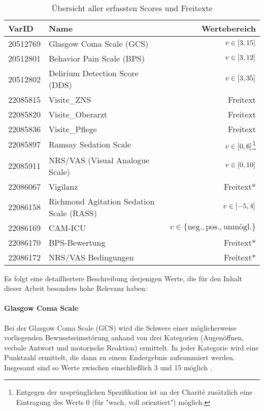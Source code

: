 \begin{table}[htb] %
    \centering
    \begin{tabular}{llr}\toprule
        \textbf{VarID}	&\textbf{Name} &\textbf{Wertebereich} \\\midrule
        20512769    & Glasgow Coma Scale (GCS)          & $v \in \interval{3}{15}$ \\
        20512801    & Behavior Pain Scale (BPS)         & $v \in \interval{3}{12}$ \\
        20512802    & Delirium Detection Score (DDS)    & $v \in \interval{3}{35}$ \\
        22085815    & Visite\_ZNS                        & Freitext \\
        22085820    & Visite\_Oberarzt                   & Freitext \\
        22085836    & Visite\_Pflege                     & Freitext \\
        22085897    & Ramsay Sedation Scale             & $v \in \interval{0}{6}$\footnote{Entgegen der ursprünglichen Spezifikation ist an der Charité zusätzlich eine Eintragung des Werts $0$ (für "wach, voll orientiert") möglich.} \\
        22085911    & NRS/VAS (Visual Analogue Scale)   & $v \in \interval{0}{10}$ \\
        22086067    & Vigilanz                          & Freitext* \\
        22086158    & Richmond Agitation Sedation Scale (RASS) & $v \in \interval{-5}{4}$ \\
        22086169    & CAM-ICU                           & $v \in \{	\text{neg.}, \text{pos.}, \text{unmögl.} \}$ \\
        22086170    & BPS-Bewertung                     & Freitext* \\
        22086172    & NRS/VAS Bedingungen               & Freitext* \\\bottomrule
    \end{tabular}

    \caption{Übersicht aller erfassten Scores und Freitexte}
    \label{table:varids}
\end{table}

Es folgt eine detailliertere Beschreibung derjenigen Werte, die für den Inhalt dieser Arbeit besonders hohe Relevanz haben:

\paragraph{Glasgow Coma Scale}
Bei der Glasgow Coma Scale (GCS) wird die Schwere einer möglicherweise vorliegenden Bewusstseinsstörung anhand von drei Kategorien (Augenöffnen, verbale Antwort und motorische Reaktion) ermittelt. In jeder Kategorie wird eine Punktzahl ermittelt, die dann zu einem Endergebnis aufsummiert werden. Insgesamt sind so Werte zwischen einschließlich 3 und 15 möglich \citep{teasdaleAssessmentComaImpaired1974,marxIntensivmedizin2015c}.

